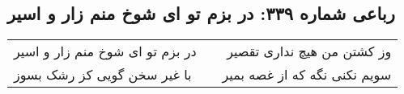 \begin{center}
\section*{رباعی شماره ۳۳۹: در بزم تو ای شوخ منم زار و اسیر}
\label{sec:sh339}
\begin{longtable}{l p{0.5cm} r}
در بزم تو ای شوخ منم زار و اسیر
&&
وز کشتن من هیچ نداری تقصیر
\\
با غیر سخن گویی کز رشک بسوز
&&
سویم نکنی نگه که از غصه بمیر
\\
\end{longtable}
\end{center}
